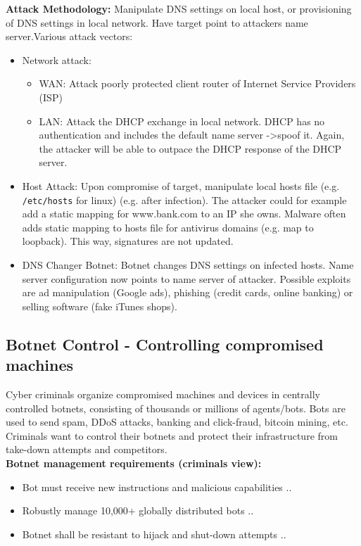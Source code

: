 \documentclass[11pt,oneside,a4paper]{article}
\begin{document}
\textbf{Attack Methodology:} Manipulate DNS settings on local host, or provisioning of DNS settings in local network. Have target point to attackers name server.Various attack vectors:

\vspace{-\topsep}
\begin{itemize}
	\setlength{\itemsep}{0pt}
	\setlength{\parskip}{0pt}
	\item Network attack:
	\begin{itemize}
		\item WAN: Attack poorly protected client router of Internet Service Providers (ISP)
		\item LAN: Attack the DHCP exchange in local network. DHCP has no authentication and includes the default name server -\textgreater spoof it. Again, the attacker will be able to outpace the DHCP response of the DHCP server.
	\end{itemize}
	\item Host Attack: Upon compromise of target, manipulate local hosts file (e.g. \texttt{/etc/hosts} for linux) (e.g. after infection). The attacker could for example add a static mapping for www.bank.com to an IP she owns. Malware often adds static mapping to hosts file for antivirus domains (e.g. map to loopback). This way, signatures are not updated.
	\item DNS Changer Botnet: Botnet changes DNS settings on infected hosts. Name server configuration now points to name server of attacker. Possible exploits are ad manipulation (Google ads), phishing (credit cards, online banking) or selling software (fake iTunes shops).
\end{itemize}
\vspace{-\topsep}

\subsection{Botnet Control - Controlling compromised machines}

Cyber criminals organize compromised machines and devices in centrally controlled botnets, consisting of thousands or millions of agents/bots. Bots are used to send spam, DDoS attacks, banking and click-fraud, bitcoin mining, etc. Criminals want to control their botnets and protect their infrastructure from take-down attempts and competitors.\\
\textbf{Botnet management requirements (criminals view):}

\vspace{-\topsep}
\begin{itemize}
	\setlength{\itemsep}{0pt}
	\setlength{\parskip}{0pt}
	\item Bot must receive new instructions and malicious capabilities ..
	\item Robustly manage 10,000+ globally distributed bots ..
	\item Botnet shall be resistant to hijack and shut-down attempts ..
\end{itemize}
\vspace{-\topsep}
\end{document}
